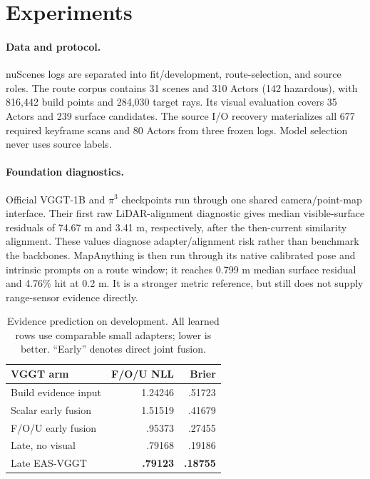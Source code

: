 \section{Experiments}
\paragraph{Data and protocol.}
nuScenes logs are separated into fit/development, route-selection, and source roles.
The route corpus contains 31 scenes and 310 Actors (142 hazardous), with 816,442 build
points and 284,030 target rays. Its visual evaluation covers 35 Actors and 239 surface
candidates. The source I/O recovery materializes all 677 required keyframe scans and
80 Actors from three frozen logs. Model selection never uses source labels.

\paragraph{Foundation diagnostics.}
Official VGGT-1B and $\pi^3$ checkpoints run through one shared camera/point-map
interface. Their first raw LiDAR-alignment diagnostic gives median visible-surface
residuals of 74.67 m and 3.41 m, respectively, after the then-current similarity
alignment. These values diagnose adapter/alignment risk rather than benchmark the
backbones. MapAnything is then run through its native calibrated pose and intrinsic
prompts on a route window; it reaches 0.799 m median surface residual and 4.76\% hit at
0.2 m. It is a stronger metric reference, but still does not supply range-sensor
evidence directly.

\begin{table}[t]
  \centering
  \caption{Evidence prediction on development. All learned rows use comparable small
  adapters; lower is better. ``Early'' denotes direct joint fusion.}
  \label{tab:e2-dev}
  \small
  \begin{tabular}{lrr}
    \toprule
    VGGT arm & F/O/U NLL & Brier \\
    \midrule
    Build evidence input & 1.24246 & .51723 \\
    Scalar early fusion & 1.51519 & .41679 \\
    F/O/U early fusion & .95373 & .27455 \\
    Late, no visual & .79168 & .19186 \\
    Late EAS-VGGT & \textbf{.79123} & \textbf{.18755} \\
    \bottomrule
  \end{tabular}
\end{table}

